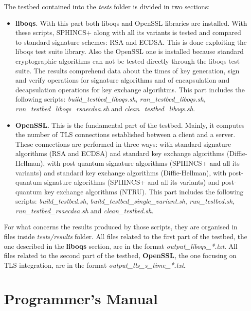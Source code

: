\documentclass[a4paper,12pt]{article}
\begin{document}
The testbed contained into the \textit{tests} folder is divided in two sections: 
\begin{itemize}
    \item \textbf{liboqs}. With this part both liboqs and OpenSSL libraries are installed.
    With these scripts, SPHINCS+ along with all its variants is tested and compared to standard signature schemes: RSA and ECDSA.
    This is done exploiting the liboqs test suite library. Also the OpenSSL one is installed because standard cryptographic algorithms can not be tested directly through the liboqs test suite.
    The results comprehend data about the times of key generation, sign and verify operations for signature algorithms and of encapsulation and decapsulation operations for key exchange algorihtms.
    This part includes the following scripts: \textit{build\_testbed\_liboqs.sh}, \textit{run\_testbed\_liboqs.sh}, \textit{run\_testbed\_liboqs\_rsaecdsa.sh} and  \textit{clean\_testbed\_liboqs.sh}.
    \item \textbf{OpenSSL}. This is the fundamental part of the testbed. Mainly, it computes the number of TLS connections established between a client and a server. These connections are performed in three ways: with standard signature algorithms (RSA and ECDSA) and standard key exchange algorithms (Diffie-Hellman), with post-quantum signature algorithms (SPHINCS+ and all its variants) and standard key exchange algorithms (Diffie-Hellman), with post-quantum signature algorithms (SPHINCS+ and all its variants) and post-quantum key exchange algorithms (NTRU).
    This part includes the following scripts: \textit{build\_testbed.sh}, \textit{build\_testbed\_single\_variant.sh}, \textit{run\_testbed.sh}, \textit{run\_testbed\_rsaecdsa.sh} and \textit{clean\_testbed.sh}.
\end{itemize}

For what concerns the results produced by those scripts, they are organised in files inside \textit{tests/results} folder.
All files related to the first part of the testbed, the one described in the \textbf{liboqs} section, are in the format \textit{output\_liboqs\_*.txt}. All files related to the second part of the testbed, \textbf{OpenSSL}, the one focusing on TLS integration, are in the format \textit{output\_tls\_s\_time\_*.txt}.

\section{Programmer's Manual}
\label{sec:programmermanual}
\end{document}
